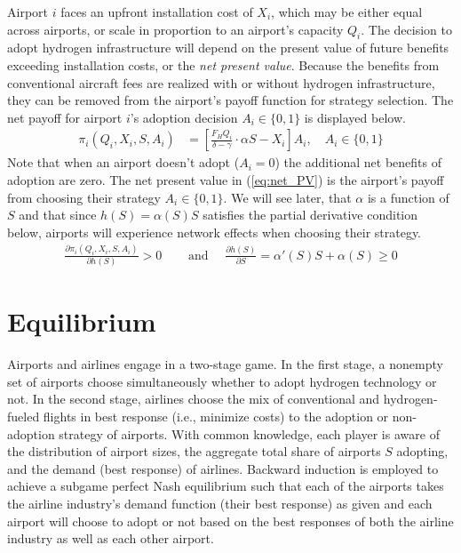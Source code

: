 \documentclass[a4paper, 14pt]{article}
\begin{document}
Airport $i$ faces an upfront installation cost of $X_i$, which may be either equal across airports, or scale in proportion to an airport's capacity $Q_i$.
The decision to adopt hydrogen infrastructure will depend on the present value of future benefits exceeding installation costs, or the \textit{net present value}.
Because the benefits from conventional aircraft fees are realized with or without hydrogen infrastructure, they can be removed from the airport's payoff function for strategy selection.
The net payoff for airport $i$'s adoption decision $A_i \in \{0,1\}$ is displayed below.
\begin{align}
    \pi_i(Q_i, X_i, S, A_i) &= \left[ \frac{F_H Q_i}{\delta - \gamma} \cdot \alpha S - X_i \right]A_i, \quad A_i \in \{0,1\} \label{eq:net_PV}
\end{align}
Note that when an airport doesn't adopt ($A_i=0$) the additional net benefits of adoption are zero.
The net present value in (\ref{eq:net_PV}) is the airport's payoff from choosing their strategy $A_i \in \{0,1\}$.
We will see later, that $\alpha$ is a function of $S$ and that since $h(S) = \alpha(S)S$ satisfies the partial derivative condition below, airports will experience network effects when choosing their strategy.
\begin{align}
    \frac{\partial \pi_i(Q_i, X_i, S, A_i)}{\partial h(S)} > 0 \quad&\text{ and }\quad \frac{\partial h(S)}{\partial S} = \alpha'(S)S + \alpha(S) \geq 0 \nonumber
\end{align}

\section{Equilibrium}
\label{sec:equilibrium}
Airports and airlines engage in a two-stage game.
In the first stage, a nonempty set of airports choose simultaneously whether to adopt hydrogen technology or not.
In the second stage, airlines choose the mix of conventional and hydrogen-fueled flights in best response (i.e., minimize costs) to the adoption or non-adoption strategy of airports.
With common knowledge, each player is aware of the distribution of airport sizes, the aggregate total share of airports $S$ adopting, and the demand (best response) of airlines.
Backward induction is employed to achieve a subgame perfect Nash equilibrium such that each of the airports takes the airline industry's demand function (their best response) as given and each airport will choose to adopt or not based on the best responses of both the airline industry as well as each other airport.
\end{document}
